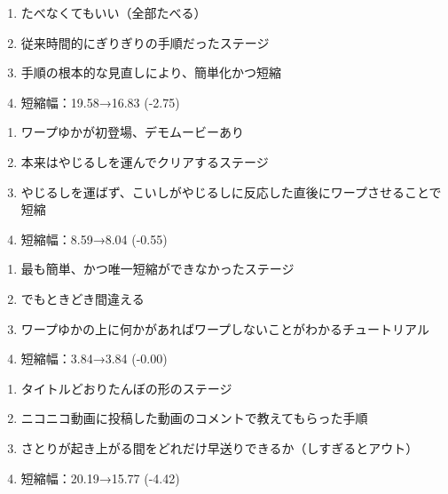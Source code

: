 \begin{enumerate}[label={\sarrow}]
\item たべなくてもいい（全部たべる）
\item 従来時間的にぎりぎりの手順だったステージ
\item 手順の根本的な見直しにより、簡単化かつ短縮
\item 短縮幅：19.58→16.83 (-2.75)
\end{enumerate}



\begin{enumerate}[label={\sarrow}]
\item ワープゆかが初登場、デモムービーあり
\item 本来はやじるしを運んでクリアするステージ
\item やじるしを運ばず、こいしがやじるしに反応した直後にワープさせることで短縮
\item 短縮幅：8.59→8.04 (-0.55)
\end{enumerate}



\begin{enumerate}[label={\sarrow}]
\item 最も簡単、かつ唯一短縮ができなかったステージ
\item でもときどき間違える
\item ワープゆかの上に何かがあればワープしないことがわかるチュートリアル
\item 短縮幅：3.84→3.84 (-0.00)
\end{enumerate}



\begin{enumerate}[label={\sarrow}]
\item タイトルどおりたんぼの形のステージ
\item ニコニコ動画に投稿した動画のコメントで教えてもらった手順
\item さとりが起き上がる間をどれだけ早送りできるか（しすぎるとアウト）
\item 短縮幅：20.19→15.77 (-4.42)
\end{enumerate}



